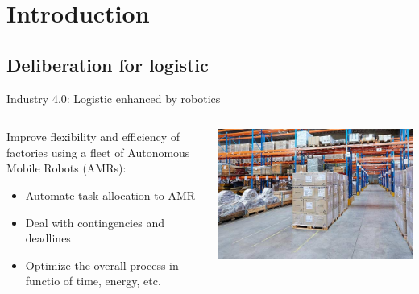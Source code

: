 \section{Introduction}
\subsection{Deliberation for logistic}

\begin{frame}{Industry 4.0: Logistic enhanced by robotics}
    \centering
\begin{columns}
    \begin{column}{0.5\textwidth}
        Improve flexibility and efficiency of factories using a fleet of Autonomous Mobile Robots (AMRs):
        \begin{itemize}
            \pause
            \item Automate task allocation to AMR
            \pause
            \item Deal with contingencies and deadlines
            \pause
            \item Optimize the overall process in functio of time, energy, etc.
        \end{itemize}
    \end{column}
    \begin{column}{0.5\textwidth}
        \includegraphics[width = \textwidth]{images/logisticsolutions.jpg}
    \end{column}
\end{columns}
\end{frame}

